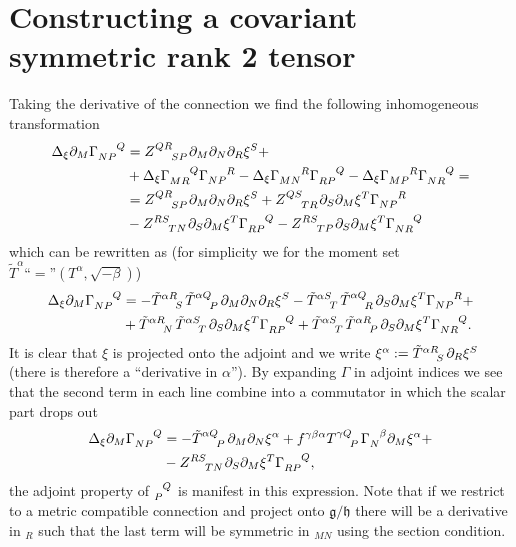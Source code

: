 \documentclass{article}
\begin{document}
\section{Constructing a covariant symmetric rank 2 tensor}
Taking the derivative of the connection we find the following inhomogeneous transformation 
\begin{align*}
    \Delta_\xi \pd_M\tensor{\Gamma}{_{NP}^Q} &= \tensor{Z}{^{QR}_{SP}}\pd_M\pd_N\pd_R \xi^S+\\
    &+ \Delta_\xi\tensor{\Gamma}{_{MR}^Q}\tensor{\Gamma}{_{NP}^R}-\Delta_\xi\tensor{\Gamma}{_{MN}^R}\tensor{\Gamma}{_{RP}^Q}-\Delta_\xi \tensor{\Gamma}{_{MP}^R}\tensor{\Gamma}{_{NR}^Q}=\\
    &= \tensor{Z}{^{QR}_{SP}}\pd_M\pd_N\pd_R \xi^S + \tensor{Z}{^{QS}_{TR}}\pd_S\pd_M\xi^T\tensor{\Gamma}{_{NP}^R} \\
    &-\tensor{Z}{^{RS}_{TN}}\pd_S\pd_M\xi^T\tensor{\Gamma}{_{RP}^Q}-\tensor{Z}{^{RS}_{TP}}\pd_S\pd_M\xi^T\tensor{\Gamma}{_{NR}^Q}
\end{align*}
which can be rewritten as (for simplicity we for the moment set $\tilde{T}^\alpha\text{``}=\text{''}(T^\alpha,\sqrt{-\beta})$)
\begin{align*}
    \Delta_\xi \pd_M\tensor{\Gamma}{_{NP}^Q} &= -\tensor{\tilde{T}}{^\alpha ^R_S}\tensor{\tilde{T}}{^\alpha ^Q_P} \pd_M\pd_N\pd_R\xi^S-\tensor{\tilde{T}}{^\alpha ^S_T}\tensor{\tilde{T}}{^\alpha ^Q_R}\pd_S\pd_M\xi^T\tensor{\Gamma}{_{NP}^R}+\\
    &+\tensor{\tilde{T}}{^\alpha ^R_N}\tensor{\tilde{T}}{^\alpha ^S_T}\pd_S\pd_M\xi^T\tensor{\Gamma}{_{RP}^Q}+\tensor{\tilde{T}}{^\alpha ^S_T}\tensor{\tilde{T}}{^\alpha ^R_P}\pd_S\pd_M\xi^T\tensor{\Gamma}{_{NR}^Q}. 
\end{align*}
It is clear that $\xi$ is projected onto the adjoint and we write $\xi^\alpha:=\tensor{\tilde{T}}{^\alpha ^R_S}\pd_R\xi^S$ (there is therefore a ``derivative in $\alpha$''). By expanding $\Gamma$ in adjoint indices we see that the second term in each line combine into a commutator in which the scalar part drops out 
\begin{align*}
    \Delta_\xi \pd_M\tensor{\Gamma}{_{NP}^Q} &= -\tensor{\tilde{T}}{^\alpha^Q_P}\pd_M\pd_N\xi^\alpha+f^{\gamma\beta\alpha}\tensor{T}{^{\gamma Q}_P}\tensor{\Gamma}{_N^\beta}\pd_M\xi^\alpha+\\
    &-\tensor{Z}{^{RS}_{TN}}\pd_S\pd_M\xi^T\tensor{\Gamma}{_{RP}^Q},
\end{align*}
the adjoint property of $\tensor{}{_P^Q}$ is manifest in this expression. Note that if we restrict to a metric compatible connection and project onto $\mathfrak{g}/\mathfrak{h}$ there will be a derivative in $_R$ such that the last term will be symmetric in $_{MN}$ using the section condition. 
\end{document}
